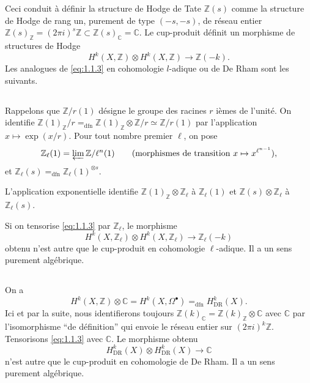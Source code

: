 \documentclass[10pt,leqno]{amsart}
\theoremstyle{plain}
\theoremstyle{definition}
\theoremstyle{remark}
\newcommand{\ZZ}{\mathbb{Z}}
\newcommand{\CC}{\mathbb{C}}
\begin{document}
Ceci conduit \`a d\'efinir la structure de Hodge de Tate $\ZZ(s)$ comme la structure de Hodge de rang un, purement de type $(-s,-s)$, de r\'eseau entier $\ZZ(s)_\ZZ=(2\pi i)^s\ZZ\subset\ZZ(s)_\CC=\CC$. Le cup-produit d\'efinit un morphisme de structures de Hodge
\begin{equation}\label{eq:1.1.3}
H^k(X,\ZZ)\otimes H^k(X,\ZZ)\to\ZZ(-k).
\end{equation}
Les analogues de \eqref{eq:1.1.3} en cohomologie $l$-adique ou de De Rham sont les suivants.

\subsection{}\label{1.2}

Rappelons que $\ZZ/r(1)$ d\'esigne le groupe des racines $r$ i\`emes de l'unit\'e. On identifie $\ZZ(1)_\ZZ/r=_{\mathrm{dfn}}\ZZ(1)_\ZZ\otimes\ZZ/r\simeq\ZZ/r(1)$ par l'application $x\mapsto\exp(x/r)$. Pour tout nombre premier $\ell$, on pose
\[
\ZZ_\ell(1)=\varprojlim\ZZ/\ell^n(1)\qquad\text{(morphismes de transition $x\mapsto x^{\ell^{n-1}}$)},
\]
et $\ZZ_\ell(s)=_{\mathrm{dfn}}\ZZ_\ell(1)^{\otimes s}$.

L'application exponentielle identifie $\ZZ(1)_\ZZ\otimes\ZZ_\ell$ \`a $\ZZ_\ell(1)$ et $\ZZ(s)\otimes\ZZ_\ell$ \`a $\ZZ_\ell(s)$.

Si on tensorise \eqref{eq:1.1.3} par $\ZZ_\ell$, le morphisme
\begin{equation}\label{eq:1.2.1}
H^k(X,\ZZ_\ell)\otimes H^k(X,\ZZ_\ell)\to\ZZ_\ell(-k)
\end{equation}
obtenu n'est autre que le cup-produit en cohomologie $\ell$-adique. Il a un sens purement alg\'ebrique.

\subsection{}\label{1.3}

On a
\begin{equation}\label{eq:1.3.1}
H^k(X,\ZZ)\otimes\CC=H^k(X,\Omega^\bullet)=_{\mathrm{dfn}}H^k_{\mathrm{DR}}(X).
\end{equation}
Ici et par la suite, nous identifierons toujours $\ZZ(k)_\CC=\ZZ(k)_\ZZ\otimes\CC$ avec $\CC$ par l'isomorphisme ``de d\'efinition'' qui envoie le r\'eseau entier sur $(2\pi i)^k\ZZ$. Tensorisons \eqref{eq:1.1.3} avec $\CC$. Le morphisme obtenu
\begin{equation}\label{eq:1.3.2}
H^k_{\mathrm{DR}}(X)\otimes H^k_{\mathrm{DR}}(X)\to\CC
\end{equation}
n'est autre que le cup-produit en cohomologie de De Rham. Il a un sens purement alg\'ebrique.
\end{document}
